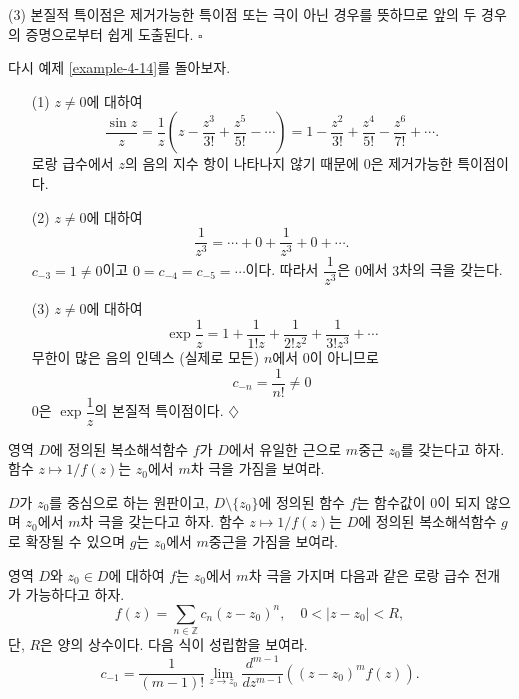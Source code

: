 (3) 본질적 특이점은 제거가능한 특이점 또는 극이 아닌 경우를 뜻하므로
앞의 두 경우의 증명으로부터 쉽게 도출된다.
\hfill $\square$

다시 예제 \ref{example-4-14}를 돌아보자.

\begin{saltexample}[label=example-4-16]{}{}

\begin{itemize}
\item[(1)] $z\ne0$에 대하여
\[
\dfrac{\sin z}z = \dfrac 1z\left( z - \dfrac{z^3}{3!} + \dfrac{z^5}{5!} - \cdots
\right) =1 - \dfrac{z^2}{3!} + \dfrac{z^4}{5!} - \dfrac{z^6}{7!} + \cdots.
\]
로랑 급수에서 $z$의 음의 지수 항이 나타나지 않기 때문에
$0$은 제거가능한 특이점이다.
\item[(2)] $z\ne0$에 대하여 
\[
\dfrac1{z^3} = \cdots + 0 + \dfrac1{z^3} + 0 + \cdots.
\]
$c_{-3}=1 \ne 0$이고 $0=c_{-4} = c_{-5} = \cdots$이다.
따라서 $\dfrac1{z^3}$은 $0$에서 $3$차의 극을 갖는다.
\item[(3)] $z\ne0$에 대하여 
\[
\exp \dfrac1z = 1 + \dfrac1{1!z} + \dfrac1{2!z^2} + \dfrac1{3!z^3} + \cdots
\]
무한이 많은 음의 인덱스 (실제로 모든) $n$에서 $0$이 아니므로
\[
c_{-n} = \dfrac1{n!} \ne 0
\]
$0$은 $\exp \dfrac1z$의 본질적 특이점이다.
\hfill $\diamondsuit$
\end{itemize}
\end{saltexample}

\begin{salt_exercise}\label{ex-4-30}
영역 $D$에 정의된 복소해석함수 $f$가 $D$에서 유일한 근으로
$m$중근 $z_0$를 갖는다고 하자.
함수 $z\mapsto 1/f(z)$는 $z_0$에서 $m$차 극을 가짐을 보여라.
\end{salt_exercise}

\begin{salt_exercise}\label{ex-4-31}
$D$가 $z_0$를 중심으로 하는 원판이고, 
$D\setminus \{z_0\}$에 정의된 함수 $f$는 함수값이 $0$이 되지 않으며
$z_0$에서 $m$차 극을 갖는다고 하자. 
함수 $z\mapsto 1/f(z)$는 $D$에 정의된 복소해석함수 $g$로 확장될 수 있으며
$g$는 $z_0$에서 $m$중근을 가짐을 보여라.
\end{salt_exercise}

\begin{salt_exercise}\label{ex-4-32}
영역 $D$와  $z_0\in D$에 대하여
$f$는 $z_0$에서 $m$차 극을 가지며 다음과 같은 로랑 급수 전개가 가능하다고 하자.
\[
f(z) = \sum_{n\in\mathbb Z} c_n(z-z_0)^n,\quad
0<|z-z_0|<R,
\]
단, $R$은 양의 상수이다. 다음 식이 성립함을 보여라.
\[
c_{-1} = \dfrac1{(m-1)!}\lim_{z\to z_0} \dfrac{d^{m-1}}{dz^{m-1}}
\left( (z-z_0)^m f(z) \right).
\]
\end{salt_exercise}

